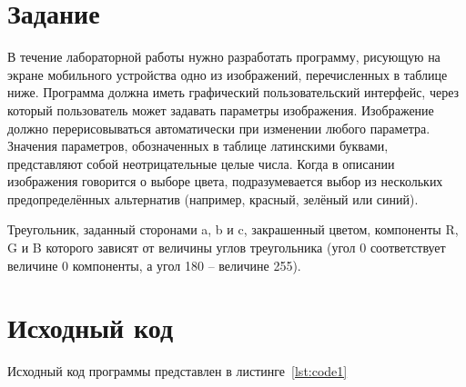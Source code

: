 \documentclass[a4paper, 14pt]{extarticle}
\begin{document}
\renewcommand{\ttdefault}{pcr}

\setlength{\tabcolsep}{3pt}
\newpage
\setcounter{page}{2}

\section{Задание}\label{Sect::task}
В течение лабораторной работы нужно разработать программу, рисующую на экране
мобильного устройства одно из изображений, перечисленных в таблице ниже. Программа
должна иметь графический пользовательский интерфейс, через который пользователь может
задавать параметры изображения. Изображение должно перерисовываться автоматически при
изменении любого параметра. Значения параметров, обозначенных в таблице латинскими
буквами, представляют собой неотрицательные целые числа. Когда в описании изображения
говорится о выборе цвета, подразумевается выбор из нескольких предопределённых
альтернатив (например, красный, зелёный или синий).


Треугольник, заданный сторонами a, b и c, закрашенный цветом,
компоненты R, G и B которого зависят от величины углов треугольника
(угол 0 соответствует величине 0 компоненты, а угол 180 – величине 255).
\newpage
\section{Исходный код}

Исходный код программы представлен в листинге~\ref{lst:code1}
\end{document}

